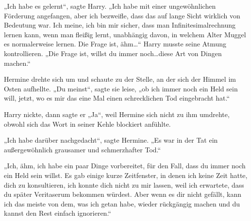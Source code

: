 „Ich habe es gelernt“, sagte Harry. „Ich habe mit einer ungewöhnlichen Förderung angefangen, aber ich bezweifle, dass das auf lange Sicht wirklich von Bedeutung war. Ich meine, ich bin mir sicher, dass man Infinitesimalrechnung lernen kann, wenn man fleißig lernt, unabhängig davon, in welchem Alter Muggel es normalerweise lernen. Die Frage ist, ähm…“ Harry musste seine Atmung kontrollieren. „Die Frage ist, willst du immer noch…diese Art von Dingen machen.“

Hermine drehte sich um und schaute zu der Stelle, an der sich der Himmel im Osten aufhellte. „Du meinst“, sagte sie leise, „ob ich immer noch ein Held sein will, jetzt, wo es mir das eine Mal einen schrecklichen Tod eingebracht hat.“

Harry nickte, dann sagte er „Ja“, weil Hermine sich nicht zu ihm umdrehte, obwohl sich das Wort in seiner Kehle blockiert anfühlte.

„Ich habe darüber nachgedacht“, sagte Hermine. „Es war in der Tat ein außergewöhnlich grausamer und schmerzhafter Tod.“

„Ich, ähm, ich habe ein paar Dinge vorbereitet, für den Fall, dass du immer noch ein Held sein willst. Es gab einige kurze Zeitfenster, in denen ich keine Zeit hatte, dich zu konsultieren, ich konnte dich nicht zu mir lassen, weil ich erwartete, dass du später Veritaserum bekommen würdest. Aber wenn es dir nicht gefällt, kann ich das meiste von dem, was ich getan habe, wieder rückgängig machen und du kannst den Rest einfach ignorieren.“


